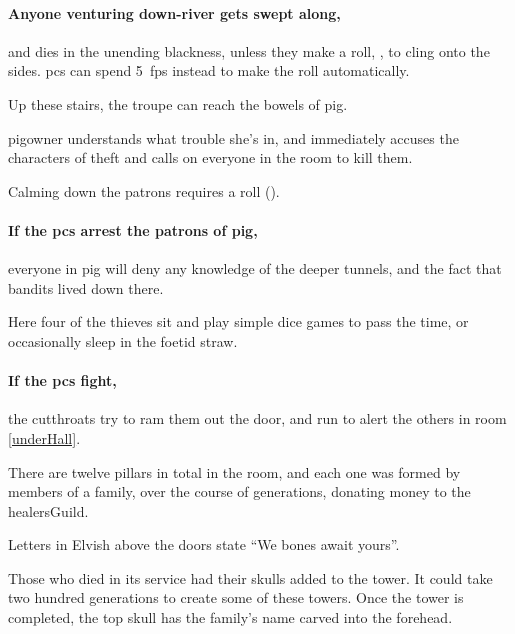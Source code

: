 \paragraph{Anyone venturing down-river gets swept along,}
and dies in the unending blackness, unless they make a  roll, \tn[10], to cling onto the sides.
\Glspl{pc} can spend 5~\glspl{fp} instead to make the roll automatically.


Up these stairs, the troupe can reach the bowels of \gls{pig}.

\Gls{pigowner} understands what trouble she's in, and immediately accuses the characters of theft and calls on everyone in the room to kill them.

Calming down the patrons requires a  roll (\tn[10]).

\paragraph{If the \glspl{pc} arrest the patrons of \gls{pig},}
everyone in \gls{pig} will deny any knowledge of the deeper tunnels, and the fact that bandits lived down there.


Here four of the thieves sit and play simple dice games to pass the time, or occasionally sleep in the foetid straw.

\paragraph{If the \glspl{pc} fight,}
the cutthroats try to ram them out the door, and run to alert the others in room \ref{underHall}.



There are twelve pillars in total in the room, and each one was formed by members of a family, over the course of generations, donating money to the \gls{healersGuild}.

\begin{boxtext}
  Letters in Elvish above the doors state ``We bones await yours''.
\end{boxtext}

Those who died in its service had their skulls added to the tower.
It could take two hundred generations to create some of these towers.
Once the tower is completed, the top skull has the family's name carved into the forehead.

